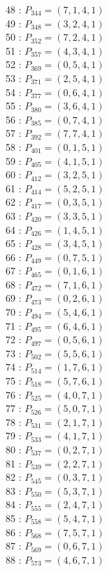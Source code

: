 \documentclass{article}
\begin{document}
{\begin{multicols}{3}
48 : $P_{344}=( 7, 1, 4, 1 )$\\
49 : $P_{348}=( 3, 2, 4, 1 )$\\
50 : $P_{352}=( 7, 2, 4, 1 )$\\
51 : $P_{357}=( 4, 3, 4, 1 )$\\
52 : $P_{369}=( 0, 5, 4, 1 )$\\
53 : $P_{371}=( 2, 5, 4, 1 )$\\
54 : $P_{377}=( 0, 6, 4, 1 )$\\
55 : $P_{380}=( 3, 6, 4, 1 )$\\
56 : $P_{385}=( 0, 7, 4, 1 )$\\
57 : $P_{392}=( 7, 7, 4, 1 )$\\
58 : $P_{401}=( 0, 1, 5, 1 )$\\
59 : $P_{405}=( 4, 1, 5, 1 )$\\
60 : $P_{412}=( 3, 2, 5, 1 )$\\
61 : $P_{414}=( 5, 2, 5, 1 )$\\
62 : $P_{417}=( 0, 3, 5, 1 )$\\
63 : $P_{420}=( 3, 3, 5, 1 )$\\
64 : $P_{426}=( 1, 4, 5, 1 )$\\
65 : $P_{428}=( 3, 4, 5, 1 )$\\
66 : $P_{449}=( 0, 7, 5, 1 )$\\
67 : $P_{465}=( 0, 1, 6, 1 )$\\
68 : $P_{472}=( 7, 1, 6, 1 )$\\
69 : $P_{473}=( 0, 2, 6, 1 )$\\
70 : $P_{494}=( 5, 4, 6, 1 )$\\
71 : $P_{495}=( 6, 4, 6, 1 )$\\
72 : $P_{497}=( 0, 5, 6, 1 )$\\
73 : $P_{502}=( 5, 5, 6, 1 )$\\
74 : $P_{514}=( 1, 7, 6, 1 )$\\
75 : $P_{518}=( 5, 7, 6, 1 )$\\
76 : $P_{525}=( 4, 0, 7, 1 )$\\
77 : $P_{526}=( 5, 0, 7, 1 )$\\
78 : $P_{531}=( 2, 1, 7, 1 )$\\
79 : $P_{533}=( 4, 1, 7, 1 )$\\
80 : $P_{537}=( 0, 2, 7, 1 )$\\
81 : $P_{539}=( 2, 2, 7, 1 )$\\
82 : $P_{545}=( 0, 3, 7, 1 )$\\
83 : $P_{550}=( 5, 3, 7, 1 )$\\
84 : $P_{555}=( 2, 4, 7, 1 )$\\
85 : $P_{558}=( 5, 4, 7, 1 )$\\
86 : $P_{568}=( 7, 5, 7, 1 )$\\
87 : $P_{569}=( 0, 6, 7, 1 )$\\
88 : $P_{573}=( 4, 6, 7, 1 )$\\
\end{multicols}


}
\end{document}
